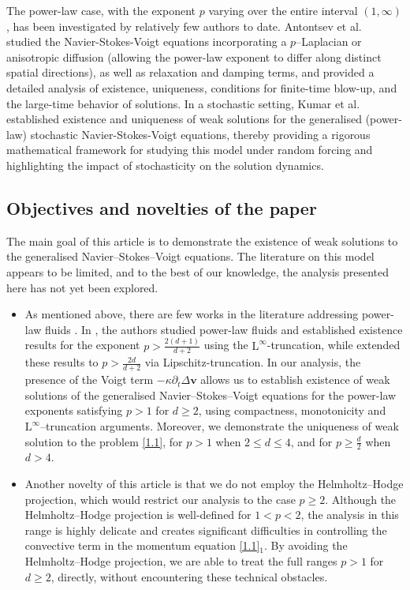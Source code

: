 \documentclass[12pt,reqno]{amsart}
\numberwithin{equation}{section}
\theoremstyle{definition}
\def\L{\mathrm{L}}
\def\vv{\boldsymbol{v}}
\begin{document}
The power-law case, with the exponent $p$ varying over the entire interval $(1,\infty)$, has been investigated by relatively few authors to date.
{Antontsev et al.}~\cite{Ant-Oliv-Khom-2019,Ant-Oliv-Khom-2021b,Ant-Khom-2017} studied the Navier-Stokes-Voigt equations incorporating a $p$--Laplacian or anisotropic diffusion (allowing the power-law exponent to differ along distinct spatial directions), as well as relaxation and damping terms, and provided a detailed analysis of existence, uniqueness, conditions for finite-time blow-up, and the large-time behavior of solutions.
In a stochastic setting, {Kumar et al.}~\cite{Kumar:2025} established existence and uniqueness of weak solutions for the generalised (power-law) stochastic Navier-Stokes-Voigt equations, thereby providing a rigorous mathematical framework for studying this model under random forcing and highlighting the impact of stochasticity on the solution dynamics.


\subsection{Objectives and novelties of the paper}
The main goal of this article is to demonstrate the existence of weak solutions to the generalised Navier--Stokes--Voigt equations. The literature on this model appears to be limited, and to the best of our knowledge, the analysis presented here has not yet been explored.
\begin{itemize}
	\item
As mentioned above, there are few works in the literature addressing power-law fluids \cite{Ant-Oliv-Khom-2019,Ant-Oliv-Khom-2021b,Ant-Khom-2017,DRW, Wolf:2007}. In \cite{Wolf:2007}, the authors studied power-law fluids and established existence results for the exponent $p >\frac{2(d+1)}{d+2}$ using the $\L^\infty$-truncation, while \cite{DRW} extended these results to $p >\frac{2d}{d+2}$ via Lipschitz-truncation.
In our analysis, the presence of the Voigt term $-\kappa \partial_t\Delta\vv$ allows us to establish existence of weak solutions of the generalised Navier--Stokes--Voigt equations for the power-law exponents satisfying $p>1$ for $d\geq 2$, using compactness, monotonicity and $\L^\infty$--truncation arguments. {Moreover, we demonstrate the uniqueness of weak solution to the problem \eqref{1.1}, for $p>1$ when $2\leq d\leq 4 $, and for  $p\geq \frac{d}{2}$ when $d>4$.}
\item Another novelty of this article is that we do not employ the Helmholtz--Hodge projection, which would restrict our analysis to the case $p \geq 2$. Although the Helmholtz--Hodge projection is well-defined for $1<p <2$, the analysis in this range is highly delicate and creates significant difficulties in controlling the convective term in the momentum equation \eqref{1.1}$_1$. {By avoiding the Helmholtz--Hodge projection, we are able to treat the full ranges {$p>1$ for $d\geq 2$,} directly, without encountering these technical obstacles.}
\end{itemize}
\end{document}

